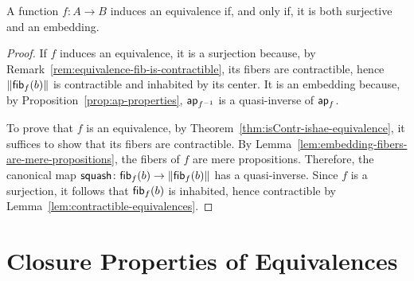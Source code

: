 \begin{thm}\fe\label{thm:equivalence-iff-embedding+surjective}
    A function\/ $f\colon A\to B$ induces an equivalence if, and only if, it is both surjective and an embedding.
\end{thm}

\begin{proof}
    If $f$ induces an equivalence, it is a surjection because, by Remark~\ref{rem:equivalence-fib-is-contractible}, its fibers are contractible, hence $\lVert\mathsf{fib}_f(b)\rVert$ is contractible and inhabited by its center. It is an embedding because, by Proposition~\ref{prop:ap-properties}, $\mathsf{ap}_{f^{-1}}$ is a quasi-inverse of $\mathsf{ap}_f$.

    To prove that $f$ is an equivalence, by Theorem~\ref{thm:isContr-ishae-equivalence}, it suffices to show that its fibers are contractible. By Lemma~\ref{lem:embedding-fibers-are-mere-propositions}, the fibers of $f$ are mere propositions. Therefore, the canonical map $\fun{squash}\colon\fun{fib}_f(b)\to\lVert\fun{fib}_f(b)\rVert$ has a quasi-inverse. Since $f$ is a surjection, it follows that $\mathsf{fib}_f(b)$ is inhabited, hence contractible by Lemma~\ref{lem:contractible-equivalences}.
    
\end{proof}

\section{Closure Properties of Equivalences}

